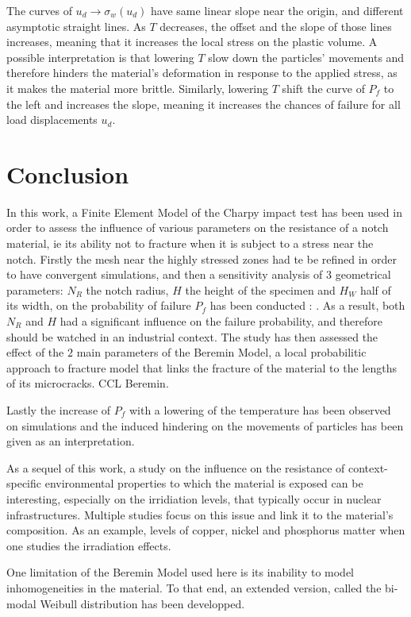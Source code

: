 \documentclass[
10pt, %
a4paper, %
oneside, %
headinclude,footinclude, %
BCOR5mm, %
]{scrartcl}
\begin{document}
The curves of $u_d \rightarrow \sigma_w(u_d)$ have same linear slope
near the origin, and different asymptotic straight lines. As $T$
decreases, the offset and the slope of those lines increases,
meaning that it increases the local stress on the plastic volume.
A possible interpretation is that lowering $T$ slow down the particles'
movements and therefore hinders the material's deformation in response
to the applied stress, as it makes the material more brittle. Similarly, lowering $T$ shift the curve of
$P_f$ to the left and increases the slope, meaning it increases the
chances of failure for all load displacements $u_d$.

\section{Conclusion}

In this work, a Finite Element Model of the Charpy impact test
has been used in order to assess the influence of various parameters on the resistance
of a notch material, ie its ability not to fracture when it is subject
to a stress near the notch. Firstly the mesh near
the highly stressed zones had te be refined in order to have convergent simulations,
and then a sensitivity analysis of $3$ geometrical parameters:
$N_R$ the notch radius, $H$ the height of the specimen and $H_W$ half
of its width, on the probability of failure $P_f$ has been conducted :
. As a result, both $N_R$ and $H$ had a significant
influence on the failure probability, and therefore should be
watched in an industrial context.
The study has then assessed the effect of the $2$ main parameters of
the Beremin Model, a local probabilitic approach to fracture model that links the fracture of the
material to the lengths of its microcracks.
CCL Beremin.

Lastly the increase of $P_f$ with a lowering of the temperature has been
observed on simulations and the induced hindering on the
movements of particles has been given as an interpretation.

As a sequel of this work, a study on the influence on the resistance
of context-specific environmental
properties to which the material is exposed can be interesting, especially
on the irridiation levels, that typically occur in nuclear infrastructures.
Multiple studies focus on this issue and link it
to the material's composition. As an example, levels of copper,
nickel and phosphorus matter when one studies the irradiation effects.

One limitation of the Beremin Model used here is its inability to model
inhomogeneities in the material. To that end, an extended version,
called the bi-modal Weibull distribution has been developped.
\end{document}

